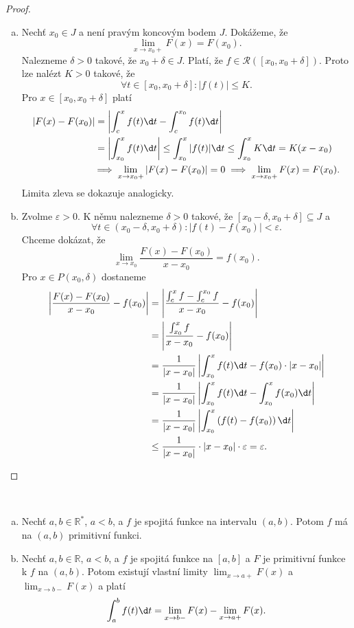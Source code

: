 \begin{proof}
	\,
	\begin{enumerate}[(a)]
		\item Nechť $x_0\in J$ a není pravým koncovým bodem $J$. Dokážeme, že
		$$
		    \lim_{x\to x_0+} F(x) = F(x_0).
		$$
		Nalezneme $\delta >0$ takové, že $x_0 + \delta \in J$. Platí, že
		$f \in \mathcal R([x_0, x_0+\delta])$. Proto lze nalézt $K>0$ takové, že
		$$
		    \forall t \in [x_0, x_0+\delta]: |f(t)|\leq K.
		$$
		Pro $x \in [x_0,x_0+\delta]$ platí
		\begin{align*}
		|F(x)-F(x_0)|  &= \left | \int_c^x f(t)\d t - \int_c^{x_0} f(t)\d t \right |\\
		& = \left |\int_{x_0}^x f(t) \d t\right| \leq \int _{x_0}^x|f(t)|\d t \leq \int_{x_0}^x K \d t = K(x-x_0)\\
		& \!\! \implies \lim_{x\to x_0+} |F(x)-F(x_0)| = 0 \implies \lim_{x\to x_0+} F(x) = F(x_0).
	    \end{align*}
		Limita zleva se dokazuje analogicky.
		\item Zvolme $\varepsilon > 0$. K němu nalezneme $\delta > 0$ takové, že
		$[x_0-\delta, x_0+\delta] \subseteq J$ a
		$$
		    \forall t \in (x_0-\delta, x_0+\delta):|f(t)-f(x_0)|<\varepsilon.
		$$
		Chceme dokázat, že
		$$
            \lim_{x\to x_0} \frac{F(x)-F(x_0)}{x-x_0}=f(x_0).
		$$
		Pro $x \in P(x_0,\delta)$ dostaneme
		\begin{align*}
		\left | \frac{F(x)-F(x_0)}{x-x_0}-f(x_0) \right | & = \left | \frac{\int_c^x f - \int_c^{x_0}f}{x-x_0}-f(x_0) \right |\\
		&= \left | \frac{\int_{x_0}^x f}{x-x_0}-f(x_0) \right | \\
		&= \frac{1}{|x-x_0|} \left | \int_{x_0}^x f(t) \d t - f(x_0)\cdot |x-x_0| \right |\\
		&= \frac{1}{|x-x_0|} \left | \int_{x_0}^x f(t) \d t - \int_{x_0}^x f(x_0)\d t \right |\\
		&= \frac{1}{|x-x_0|} \left | \int_{x_0}^x \left( f(t) - f(x_0) \right ) \d t \right |\\
	& \leq \frac{1}{|x-x_0|}\cdot |x-x_0|\cdot \varepsilon = \varepsilon.
	\end{align*}\qedhere
	\end{enumerate}
\end{proof}

\begin{dusledek}\label{dusledek8.23}\,
\begin{enumerate}[(a)]
	\item Nechť $a,b \in \mathbb{R}^\ast$, $a<b$, a $f$ je spojitá funkce na intervalu $(a,b)$. Potom $f$ má na $(a,b)$ primitivní funkci.
\item Nechť $a,b \in \mathbb{R}$, $a<b$, a $f$ je spojitá funkce na $[a,b]$ a $F$ je primitivní funkce k $f$ na $(a,b)$.
Potom existují vlastní limity $\lim_{x\to a+} F(x)$ a $\lim_{x\to b-} F(x)$ a platí
\[
\int_a^b f(t)\d t = \lim_{x\to b-} F(x) - \lim_{x\to a+} F(x).
\]
\end{enumerate}
\end{dusledek}


